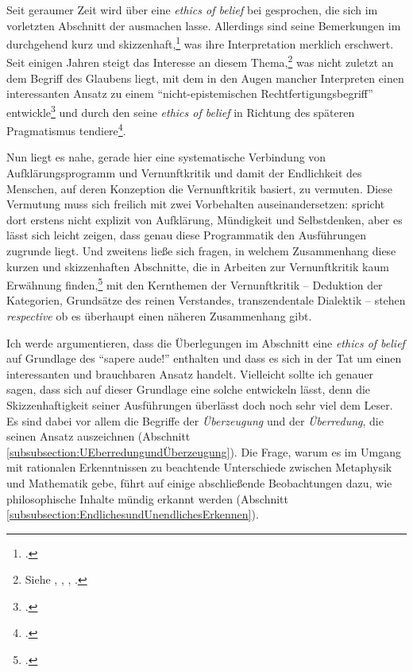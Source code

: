 Seit geraumer Zeit wird über eine \emph{ethics of belief} bei
 gesprochen, die sich im vorletzten Abschnitt der
 ausmachen lasse. Allerdings sind seine
Bemerkungen im  durchgehend kurz und
skizzenhaft,\footcite[Vgl.][323]{Chignell:BeliefinKant2007} was ihre
Interpretation merklich erschwert. Seit einigen Jahren steigt das Interesse an
diesem Thema,\footnote{Siehe
\cite{Stevenson:OpinionBelieforFaithandKnowledge2003}, \cite{Chignell:BeliefinKant2007},
\cite{Chignell:KantsConceptsofJustification2007},
\cite{Cohen:KantontheEthicsofBelief2014}.} was nicht zuletzt an dem Begriff des
Glaubens liegt, mit dem
 in den Augen mancher Interpreten einen interessanten
Ansatz zu einem \enquote{nicht-epistemischen Rechtfertigungsbegriff}
entwickle\footnote{\cite[Vgl.][\pno~33\,f.]{Chignell:KantsConceptsofJustification2007}.}
und durch den seine \emph{ethics of belief} in Richtung des späteren
Pragmatismus tendiere\footnote{\cite[Vgl.][335]{Chignell:BeliefinKant2007}.}.

Nun liegt es nahe, gerade hier eine systematische Verbindung von
Aufklärungsprogramm und Vernunftkritik und damit der Endlichkeit des Menschen,
auf deren Konzeption die Vernunftkritik basiert, zu vermuten.
Diese Vermutung muss sich freilich mit zwei Vorbehalten auseinandersetzen:
 spricht dort erstens nicht explizit von Aufklärung,
Mündigkeit und Selbstdenken, aber es lässt sich leicht zeigen, dass genau diese
Programmatik den Ausführungen zugrunde liegt. Und zweitens ließe sich fragen, in
welchem Zusammenhang diese kurzen und skizzenhaften Abschnitte, die in Arbeiten
zur Vernunftkritik kaum Erwähnung
finden,\footcite[Vgl.][\pno~323\,f.]{Chignell:BeliefinKant2007} mit den
Kernthemen der Vernunftkritik -- Deduktion der Kategorien, Grundsätze des reinen
Verstandes, transzendentale Dialektik -- stehen \emph{respective} ob es
überhaupt einen näheren Zusammenhang gibt.

Ich werde argumentieren, dass die Überlegungen im Abschnitt  eine \emph{ethics of belief} auf Grundlage des
\enquote{sapere aude!} enthalten und dass es sich in der Tat um einen
interessanten und brauchbaren Ansatz handelt. Vielleicht sollte ich genauer sagen, dass sich
auf dieser Grundlage eine solche entwickeln lässt, denn die Skizzenhaftigkeit
seiner Ausführungen überlässt doch noch sehr viel dem Leser. Es sind dabei vor
allem die Begriffe der \emph{Überzeugung} und der \emph{Überredung}, die seinen
Ansatz auszeichnen (Abschnitt \ref{subsubsection:UEberredungundÜberzeugung}). Die Frage, warum es im Umgang
mit rationalen Erkenntnissen zu beachtende Unterschiede zwischen Metaphysik und
Mathematik gebe, führt auf einige abschließende Beobachtungen dazu, wie
philosophische Inhalte mündig erkannt werden (Abschnitt
\ref{subsubsection:EndlichesundUnendlichesErkennen}).

